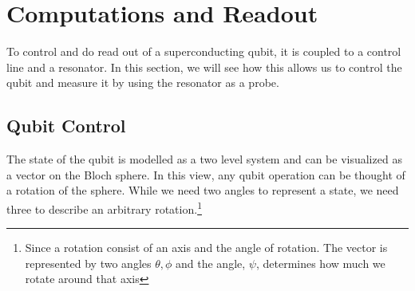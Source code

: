 \chapter{Computations and Readout}\label{chap:computations_and_readout}
To control and do read out of a superconducting qubit, it is coupled to a control line and a resonator. In this section, we will see how  this allows us to control the qubit and measure it by using the resonator as a probe.

\section{Qubit Control}\label{sec:qubit_control}
The state of the qubit is modelled as a two level system and can be visualized as a vector on the Bloch sphere. In this view, any qubit operation can be thought of a rotation of the sphere. While we need two angles to represent a state, we need three to describe an arbitrary rotation.\footnote{Since a rotation consist of an axis and the angle of rotation. The vector is represented by two angles $\theta, \phi$ and the angle, $\psi$, determines how much we rotate around that axis}

